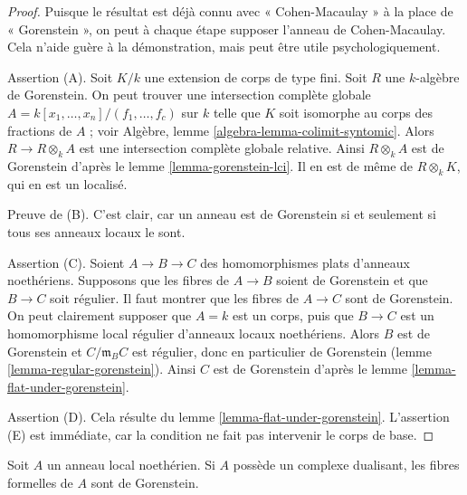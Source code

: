 \begin{proof}
Puisque le résultat est déjà connu avec « Cohen-Macaulay » à la place
de « Gorenstein », on peut à chaque étape supposer l'anneau de Cohen-Macaulay.
Cela n'aide guère à la démonstration, mais peut être utile psychologiquement.

\medskip\noindent
Assertion (A). Soit $K/k$ une extension de corps de type fini.
Soit $R$ une $k$-algèbre de Gorenstein.
On peut trouver une intersection complète globale
$A = k[x_1, \ldots, x_n]/(f_1, \ldots, f_c)$
sur $k$ telle que $K$ soit isomorphe au corps des fractions de $A$ ;
voir Algèbre, lemme \ref{algebra-lemma-colimit-syntomic}.
Alors $R \to R \otimes_k A$ est une intersection complète globale relative.
Ainsi $R \otimes_k A$ est de Gorenstein d'après le lemme \ref{lemma-gorenstein-lci}.
Il en est de même de $R \otimes_k K$, qui en est un localisé.

\medskip\noindent
Preuve de (B). C'est clair, car un anneau est de Gorenstein
si et seulement si tous ses anneaux locaux le sont.

\medskip\noindent
Assertion (C). Soient $A \to B \to C$ des homomorphismes plats d'anneaux noethériens.
Supposons que les fibres de $A \to B$ soient de Gorenstein et que $B \to C$ soit régulier.
Il faut montrer que les fibres de $A \to C$ sont de Gorenstein.
On peut clairement supposer que $A = k$ est un corps,
puis que $B \to C$ est un homomorphisme local régulier d'anneaux locaux noethériens.
Alors $B$ est de Gorenstein et $C/\mathfrak m_B C$ est régulier,
donc en particulier de Gorenstein (lemme \ref{lemma-regular-gorenstein}).
Ainsi $C$ est de Gorenstein d'après le lemme \ref{lemma-flat-under-gorenstein}.

\medskip\noindent
Assertion (D). Cela résulte du lemme \ref{lemma-flat-under-gorenstein}.
L'assertion (E) est immédiate, car la condition ne fait pas intervenir le corps de base.
\end{proof}

\begin{lemma}
\label{lemma-dualizing-gorenstein-formal-fibres}
Soit $A$ un anneau local noethérien. Si $A$ possède un complexe dualisant,
les fibres formelles de $A$ sont de Gorenstein.
\end{lemma}


